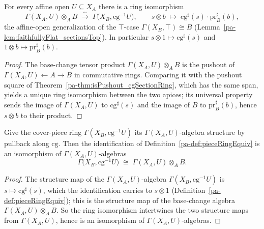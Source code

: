 \begin{definition}
  \label{pa-def:pieceRingEquiv}
  \leanok

  For every affine open \(U \subseteq X_A\) there is a ring isomorphism
  \[
    \Gamma(X_A, U) \otimes_A B \;\xrightarrow{\ \sim\ }\; \Gamma\bigl(X_B, \mathrm{cg}^{-1}U\bigr),
    \qquad s \otimes b \;\longmapsto\; \mathrm{cg}^{\sharp}(s)\cdot \mathrm{pr}_B^{\sharp}(b),
  \]
  the affine-open generalization of the \(\top\)-case \(\Gamma(X_B, \top) \cong B\)
  (Lemma~\ref{pa-lem:faithfullyFlat_sectionsTop}). In particular \(s \otimes 1 \mapsto
  \mathrm{cg}^{\sharp}(s)\) and \(1 \otimes b \mapsto \mathrm{pr}_B^{\sharp}(b)\).
\end{definition}
\begin{proof}
  \leanok
  The base-change tensor product \(\Gamma(X_A, U) \otimes_A B\) is the pushout of \(\Gamma(X_A, U)
  \leftarrow A \to B\) in commutative rings. Comparing it with the pushout square of
  Theorem~\ref{pa-thm:isPushout_cgSectionRing}, which has the same span, yields a unique ring
  isomorphism between the two apices; its universal property sends the image of \(\Gamma(X_A, U)\)
  to \(\mathrm{cg}^{\sharp}(s)\) and the image of \(B\) to \(\mathrm{pr}_B^{\sharp}(b)\), hence
  \(s \otimes b\) to their product.
\end{proof}

\begin{definition}
  \label{pa-def:pieceAlgEquiv}
  \leanok

  Give the cover-piece ring \(\Gamma(X_B, \mathrm{cg}^{-1}U)\) its \(\Gamma(X_A,
  U)\)-algebra structure by pullback along \(\mathrm{cg}\). Then the identification of
  Definition~\ref{pa-def:pieceRingEquiv} is an isomorphism of \(\Gamma(X_A, U)\)-algebras
  \[
    \Gamma\bigl(X_B, \mathrm{cg}^{-1}U\bigr) \;\cong\; \Gamma(X_A, U) \otimes_A B .
  \]
\end{definition}
\begin{proof}
  \leanok
  The structure map of the \(\Gamma(X_A, U)\)-algebra \(\Gamma(X_B, \mathrm{cg}^{-1}U)\) is
  \(s \mapsto \mathrm{cg}^{\sharp}(s)\), which the identification carries to \(s \otimes 1\)
  (Definition~\ref{pa-def:pieceRingEquiv}); this is the structure map of the base-change algebra
  \(\Gamma(X_A, U) \otimes_A B\). So the ring isomorphism intertwines the two structure maps from
  \(\Gamma(X_A, U)\), hence is an isomorphism of \(\Gamma(X_A, U)\)-algebras.
\end{proof}

